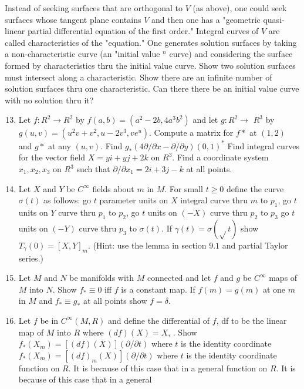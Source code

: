 \documentclass[10pt]{article}
\begin{document}
Instead of seeking surfaces that are orthogonal to $V$ (as above), one could seek surfaces whose tangent plane contains $V$ and then one has a "geometric quasi-linear partial differential equation of the first order." Integral curves of $V$ are called characteristics of the "equation." One generates solution surfaces by taking a non-characteristic curve (an "initial value ${ }^{n}$ curve) and considering the surface formed by characteristics thru the initial value curve. Show two solution surfaces must intersect along a characteristic. Show there are an infinite number of solution surfaces thru one characteristic. Can there there be an initial value curve with no solution thru it?

\begin{enumerate}
  \setcounter{enumi}{12}
  \item Let $f: R^{2} \rightarrow R^{2}$ by $f(a, b)=\left(a^{2}-2 b, 4 a^{3} b^{2}\right)$ and let $g: R^{2} \rightarrow$ $R^{3}$ by $g(u, v)=\left(u^{2} v+v^{2}, u-2 v^{3}, v e^{u}\right)$. Compute a matrix for $f *$ at $(1,2)$ and $g *$ at any $(u, v)$. Find $g_{*}(4 \partial / \partial x-\partial / \partial y)(0,1)^{*}$ Find integral curves for the vector field $X=y i+y j+2 k$ on $R^{3}$. Find a coordinate system $x_{1}, x_{2}, x_{3}$ on $R^{3}$ such that $\partial / \partial x_{1}=2 i+3 j-k$ at all points.

  \item Let $X$ and $Y$ be $C^{\infty}$ fields about $m$ in $M$. For small $t \geq 0$ define the curve $\sigma(t)$ as follows: go $t$ parameter units on $X$ integral curve thru $m$ to $p_{1}$, go $t$ units on $Y$ curve thru $p_{1}$ to $p_{2}$, go $t$ units on $(-X)$ curve thru $p_{2}$ to $p_{3}$ go $t$ units on $(-Y)$ curve thru $p_{3}$ to $\sigma(t)$. If $\gamma(t)=\sigma(\sqrt{ } t)$ show $T_{\gamma}(0)=[X, Y]_{m}$. (Hint: use the lemma in section $9.1$ and partial Taylor series.)

  \item Let $M$ and $N$ be manifolds with $M$ connected and let $f$ and $g$ be $C^{\infty}$ maps of $M$ into $N$. Show $f_{*} \equiv 0$ iff $f$ is a constant map. If $f(m)=g(m)$ at one $m$ in $M$ and $f_{*} \equiv g_{*}$ at all points show $f=\delta$.

  \item Let $f$ be in $C^{\infty}(M, R)$ and define the differential of $f$, df to be the linear map of $M$ into $R$ where $(d f)(X)=X$, . Show $f_{*}\left(X_{m}\right)=[(d f)(X)](\partial / \partial t)$ where $t$ is the identity coordinate $f_{*}\left(X_{m}\right)=\left[(d f)_{m}(X)\right](\partial / \partial t)$ where $t$ is the identity coordinate\\
function on $R$. It is because of this case that in a general function on $R .$ It is because of this case that in a general


\end{enumerate}
\end{document}
